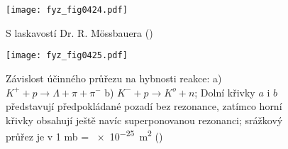   \begin{figure}[ht!] %
    \centering
    \texttt{[image: fyz\_fig0424.pdf]}
    \caption{S laskavostí Dr. R. M\"{o}ssbauera
             (\cite[s.~321]{Feynman01})}
    \label{fyz:fig0424}
  \end{figure}

  \begin{figure}[ht!] %
    \centering
    \texttt{[image: fyz\_fig0425.pdf]}
    \caption{Závislost účinného průřezu na hybnosti reakce: a) \(K^+ + p \rightarrow \Lambda + \pi 
    + \pi^-\) b) \(K^- + p \rightarrow K^o + n\); Dolní křivky \(a\) i 
    \(b\) představují předpokládané pozadí bez rezonance, zatímco horní křivky obsahují ještě navíc 
    superponovanou rezonanci; srážkový průřez je v 1 mb = \SI{e-25}{\m\squared}
             (\cite[s.~321]{Feynman01})}
    \label{fyz:fig0425}
  \end{figure}


